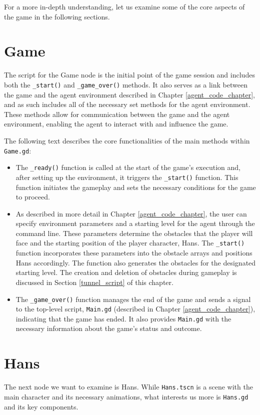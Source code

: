 For a more in-depth understanding, let us examine some of the core aspects of the game in the following sections.

\section{Game}
The script for the Game node is the initial point of the game session and includes both the \texttt{\_start()} and \texttt{\_game\_over()} methods. It also serves as a link between the game and the agent environment described in Chapter \ref{agent_code_chapter}, and as such includes all of the necessary set methods for the agent environment. These methods allow for communication between the game and the agent environment, enabling the agent to interact with and influence the game.

The following text describes the core functionalities of the main methods within \texttt{Game.gd}:
\begin{itemize}
\item The \texttt{\_ready()} function is called at the start of the game's execution and, after setting up the environment, it triggers the \texttt{\_start()} function. This function initiates the gameplay and sets the necessary conditions for the game to proceed.
\item As described in more detail in Chapter \ref{agent_code_chapter}, the user can specify environment parameters and a starting level for the agent through the command line. These parameters determine the obstacles that the player will face and the starting position of the player character, Hans. The \texttt{\_start()} function incorporates these parameters into the obstacle arrays and positions Hans accordingly. The function also generates the obstacles for the designated starting level. The creation and deletion of obstacles during gameplay is discussed in Section \ref{tunnel_script} of this chapter.
\item The \texttt{\_game\_over()} function manages the end of the game and sends a signal to the top-level script, \texttt{Main.gd} (described in Chapter \ref{agent_code_chapter}), indicating that the game has ended. It also provides \texttt{Main.gd} with the necessary information about the game's status and outcome.
\end{itemize}

\section{Hans}
The next node we want to examine is Hans. While \texttt{Hans.tscn} is a scene with the main character and its necessary animations, what interests us more is  \texttt{Hans.gd} and its key components.

